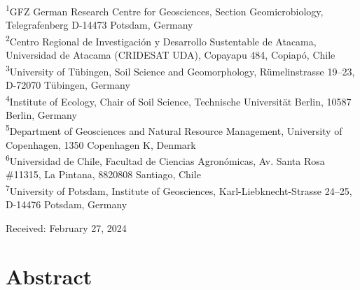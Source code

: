   \begin{scriptsize}
    \begin{justify}
        
      \textsuperscript{1}GFZ German Research Centre for Geosciences, Section Geomicrobiology, Telegrafenberg D-14473 Potsdam, Germany\\
      \textsuperscript{2}Centro Regional de Investigaci{\'o}n y Desarrollo Sustentable de Atacama, Universidad de Atacama (CRIDESAT UDA), Copayapu 484, Copiap{\'o}, Chile\\
      \textsuperscript{3}University of T{\"u}bingen, Soil Science and Geomorphology, R{\"u}melinstrasse 19--23, D-72070 T{\"u}bingen, Germany\\
      \textsuperscript{4}Institute of Ecology, Chair of Soil Science, Technische Universit{\"a}t Berlin, 10587 Berlin, Germany\\
      \textsuperscript{5}Department of Geosciences and Natural Resource Management, University of Copenhagen, 1350 Copenhagen K, Denmark\\
      \textsuperscript{6}Universidad de Chile, Facultad de Ciencias Agron{\'o}micas, Av. Santa Rosa \#11315, La Pintana, 8820808 Santiago, Chile\\
      \textsuperscript{7}University of Potsdam, Institute of Geosciences, Karl-Liebknecht-Strasse 24--25, D-14476 Potsdam, Germany

    \end{justify}
  \end{scriptsize}
    
  \vspace{0.4cm}

  \begin{flushleft}
    Received: February 27, 2024
  \end{flushleft}
  \cleardoublepage

\section*{Abstract}

